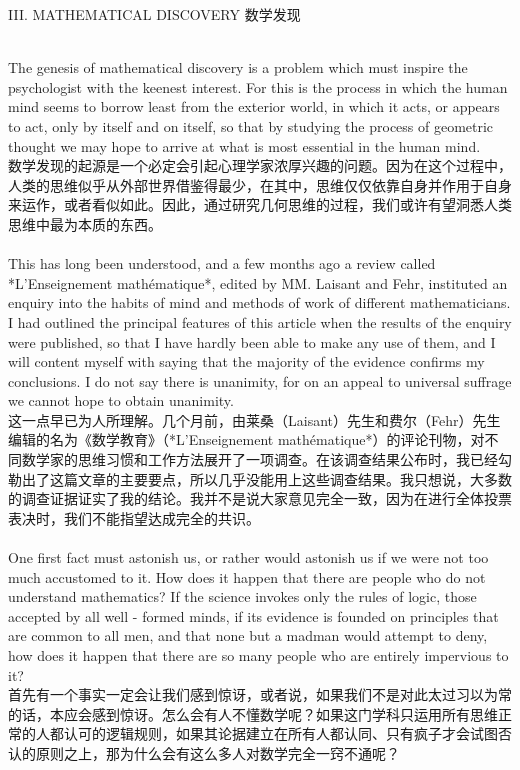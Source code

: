 \documentclass{article}
\begin{document}
\begin{center}
III. MATHEMATICAL DISCOVERY 数学发现 
\end{center}

\\
The genesis of mathematical discovery is a problem which must inspire the psychologist with the keenest interest. For this is the process in which the human mind seems to borrow least from the exterior world, in which it acts, or appears to act, only by itself and on itself, so that by studying the process of geometric thought we may hope to arrive at what is most essential in the human mind.\\
数学发现的起源是一个必定会引起心理学家浓厚兴趣的问题。因为在这个过程中，人类的思维似乎从外部世界借鉴得最少，在其中，思维仅仅依靠自身并作用于自身来运作，或者看似如此。因此，通过研究几何思维的过程，我们或许有望洞悉人类思维中最为本质的东西。 \\

\\
This has long been understood, and a few months ago a review called *L'Enseignement mathématique*, edited by MM. Laisant and Fehr, instituted an enquiry into the habits of mind and methods of work of different mathematicians. I had outlined the principal features of this article when the results of the enquiry were published, so that I have hardly been able to make any use of them, and I will content myself with saying that the majority of the evidence confirms my conclusions. I do not say there is unanimity, for on an appeal to universal suffrage we cannot hope to obtain unanimity.\\
这一点早已为人所理解。几个月前，由莱桑（Laisant）先生和费尔（Fehr）先生编辑的名为《数学教育》（*L'Enseignement mathématique*）的评论刊物，对不同数学家的思维习惯和工作方法展开了一项调查。在该调查结果公布时，我已经勾勒出了这篇文章的主要要点，所以几乎没能用上这些调查结果。我只想说，大多数的调查证据证实了我的结论。我并不是说大家意见完全一致，因为在进行全体投票表决时，我们不能指望达成完全的共识。\\  

\\
One first fact must astonish us, or rather would astonish us if we were not too much accustomed to it. How does it happen that there are people who do not understand mathematics? If the science invokes only the rules of logic, those accepted by all well - formed minds, if its evidence is founded on principles that are common to all men, and that none but a madman would attempt to deny, how does it happen that there are so many people who are entirely impervious to it?\\
首先有一个事实一定会让我们感到惊讶，或者说，如果我们不是对此太过习以为常的话，本应会感到惊讶。怎么会有人不懂数学呢？如果这门学科只运用所有思维正常的人都认可的逻辑规则，如果其论据建立在所有人都认同、只有疯子才会试图否认的原则之上，那为什么会有这么多人对数学完全一窍不通呢？ \\
\end{document}
